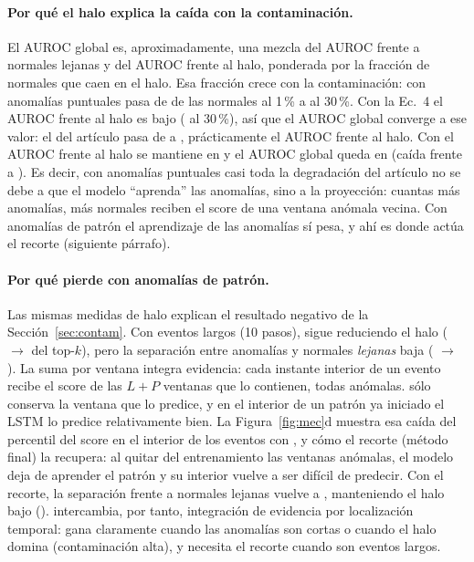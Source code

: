 \documentclass[10pt,a4paper]{article}
\begin{document}
\paragraph{Por qué el halo explica la caída con la contaminación.} El AUROC global es, aproximadamente, una
mezcla del AUROC frente a normales lejanas y del AUROC frente al halo, ponderada por la fracción de normales
que caen en el halo. Esa fracción crece con la contaminación: con anomalías puntuales pasa de
 de las normales al 1\,\% a  al 30\,\%. Con la Ec.~4
el AUROC frente al halo es bajo ( al 30\,\%), así que el AUROC global converge a
ese valor: el del artículo pasa de  a , prácticamente el AUROC
frente al halo. Con \MIII{} el AUROC frente al halo se mantiene en  y el AUROC
global queda en  (caída  frente a ).
Es decir, con anomalías puntuales casi toda la degradación del artículo no se debe a que el modelo
``aprenda'' las anomalías, sino a la proyección: cuantas más anomalías, más normales reciben el score de una
ventana anómala vecina. Con anomalías de patrón el aprendizaje de las anomalías sí pesa, y ahí es donde
actúa el recorte (siguiente párrafo).

\paragraph{Por qué \MIII{} pierde con anomalías de patrón.} Las mismas medidas de halo explican el resultado
negativo de la Sección~\ref{sec:contam}. Con eventos largos (10 pasos), \MIII{} sigue reduciendo el halo
( $\to$  del top-$k$), pero la separación entre
anomalías y normales \emph{lejanas} baja ( $\to$ ). La
suma por ventana integra evidencia: cada instante interior de un evento recibe el score de las $L+P$ ventanas
que lo contienen, todas anómalas. \MIII{} sólo conserva la ventana que lo predice, y en el interior de un
patrón ya iniciado el LSTM lo predice relativamente bien. La Figura~\ref{fig:mec}d muestra esa caída del
percentil del score en el interior de los eventos con \MIII{}, y cómo el recorte (método final) la
recupera: al quitar del entrenamiento las ventanas anómalas, el modelo deja de aprender el patrón y su
interior vuelve a ser difícil de predecir. Con el recorte, la separación frente a normales lejanas vuelve a
, manteniendo el halo bajo (). \MIII{} intercambia,
por tanto, integración de evidencia por localización temporal: gana claramente cuando las anomalías son
cortas o cuando el halo domina (contaminación alta), y necesita el recorte cuando son eventos largos.
\end{document}
